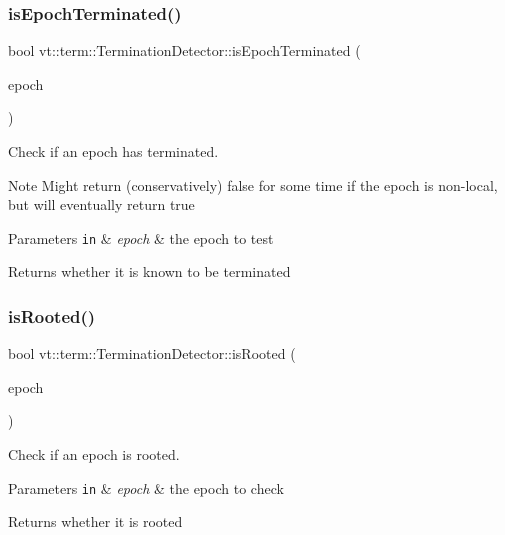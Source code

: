 \subsubsection{\texorpdfstring{is\+Epoch\+Terminated()}{isEpochTerminated()}}
{\footnotesize\ttfamily bool vt\+::term\+::\+Termination\+Detector\+::is\+Epoch\+Terminated (\begin{DoxyParamCaption}\item[{\hyperlink{namespacevt_a985a5adf291c34a3ca263b3378388236}{Epoch\+Type}}]{epoch }\end{DoxyParamCaption})}



Check if an epoch has terminated. 

\begin{DoxyNote}{Note}
Might return (conservatively) false for some time if the epoch is non-\/local, but will eventually return true
\end{DoxyNote}

\begin{DoxyParams}[1]{Parameters}
\mbox{\tt in}  & {\em epoch} & the epoch to test\\
\hline
\end{DoxyParams}
\begin{DoxyReturn}{Returns}
whether it is known to be terminated 
\end{DoxyReturn}
\mbox{\label{structvt_1_1term_1_1_termination_detector_ad95b226357b77e29c415627bbca4e798}} 
\subsubsection{\texorpdfstring{is\+Rooted()}{isRooted()}}
{\footnotesize\ttfamily bool vt\+::term\+::\+Termination\+Detector\+::is\+Rooted (\begin{DoxyParamCaption}\item[{\hyperlink{namespacevt_a985a5adf291c34a3ca263b3378388236}{Epoch\+Type}}]{epoch }\end{DoxyParamCaption})\hspace{0.3cm}{\ttfamily [inline]}}



Check if an epoch is rooted. 


\begin{DoxyParams}[1]{Parameters}
\mbox{\tt in}  & {\em epoch} & the epoch to check\\
\hline
\end{DoxyParams}
\begin{DoxyReturn}{Returns}
whether it is rooted 
\end{DoxyReturn}
\mbox{\label{structvt_1_1term_1_1_termination_detector_aa21e984d13f1e459becf695cca348920}} 
